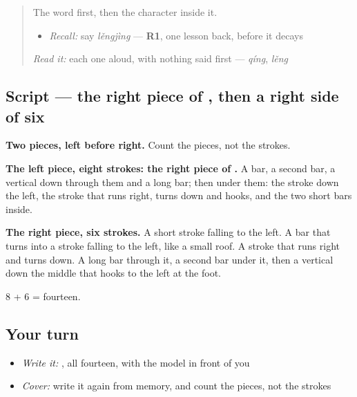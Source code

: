 \label{lesson:ZH-W466-jing-still}



\begin{quote}
The word first, then the character inside it.

\begin{itemize}
\raggedright
  \item \emph{Recall:} say \emph{lěngjìng} — \textbf{R1}, one lesson back, before it decays
\end{itemize}

\begin{quote}
 
\end{quote}

\emph{Read it:} each one aloud, with nothing said first — \emph{qíng}, \emph{lěng}
\end{quote}

\subsection*{Script — the right piece of , then a right side of six}

\begin{quote}
\end{quote}

\textbf{Two pieces, left before right.} Count the pieces, not the strokes.

\textbf{The left piece, eight strokes: the right piece of .} A bar, a second bar, a vertical down through them and a long bar; then  under them: the stroke down the left, the stroke that runs right, turns down and hooks, and the two short bars inside.

\textbf{The right piece, six strokes.} A short stroke falling to the left. A bar that turns into a stroke falling to the left, like a small roof. A stroke that runs right and turns down. A long bar through it, a second bar under it, then a vertical down the middle that hooks to the left at the foot.

8 + 6 = fourteen.

\subsection*{Your turn}
\begin{itemize}
\raggedright
  \item \emph{Write it:} , all fourteen, with the model in front of you
  \item \emph{Cover:} write it again from memory, and count the pieces, not the strokes
\end{itemize}

